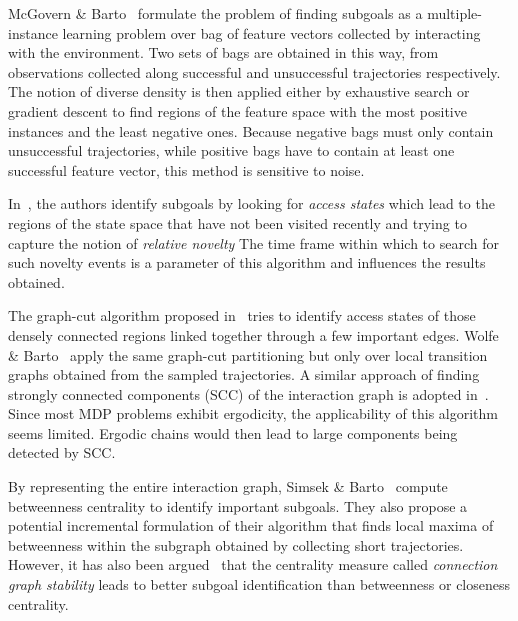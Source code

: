 \documentclass[12pt, oneside, extrafontsizes]{memoir}  %
\theoremstyle{plain}
\theoremstyle{definition}
\begin{document}
McGovern \& Barto~\cite{Mcgovern2001} formulate the problem of finding subgoals as
a multiple-instance learning problem over bag of feature vectors
collected by interacting with the environment. Two sets of bags are
obtained in this way, from observations collected
along successful and unsuccessful trajectories respectively. The notion of diverse density is then applied  either by
exhaustive search or gradient descent to find regions of the feature
space with the most positive instances and the least negative ones.
Because negative bags must only contain unsuccessful trajectories,
while positive bags have to contain at least one successful feature
vector, this method is sensitive to noise. 

In~\cite{Barto2002}, the authors identify subgoals by looking for \textit{access
states} which lead to the regions of the state space that have not
been visited recently and trying to capture the notion
of \textit{relative novelty}
The time frame
within which to search for such novelty events is a parameter of
this algorithm and influences the results obtained.

The graph-cut algorithm proposed in~\cite{Menache2002} 
tries to identify access states of those densely connected regions
linked together through a few important edges. Wolfe \& Barto~\cite{Wolfe2005} apply the same graph-cut partitioning but only over local transition
graphs obtained from the sampled trajectories.  
A similar approach of finding strongly connected components
(SCC) of the interaction graph is adopted in~\cite{Kazemitabar2009}.
Since most MDP problems  exhibit ergodicity, the applicability of this algorithm seems limited. Ergodic chains would then  lead to large components being detected by SCC.

By representing the entire interaction graph, Simsek \& Barto~\cite{Barto2009}
compute betweenness centrality to identify important subgoals. They
also propose a potential incremental formulation of their algorithm
that finds local maxima of betweenness within the subgraph obtained
by collecting short trajectories. However, it has also been argued~\cite{Rad2010} that
the centrality measure called \textit{connection graph stability} leads
to better subgoal identification than betweenness or closeness centrality.
\end{document}
